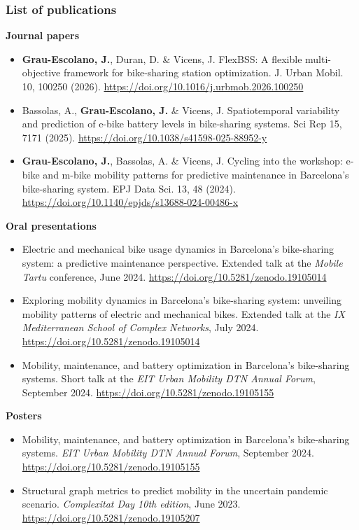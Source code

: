 \subsubsection{List of publications}

\vspace{1em} %
\textbf{Journal papers}
\begin{itemize}
    \item{\textbf{Grau-Escolano, J.}, Duran, D. \& Vicens, J.
    FlexBSS: A flexible multi-objective framework for bike-sharing station optimization. J. Urban Mobil. 10, 100250 (2026). \url{https://doi.org/10.1016/j.urbmob.2026.100250}}
    \item{Bassolas, A., \textbf{Grau-Escolano, J.} \& Vicens, J. Spatiotemporal variability and prediction of e-bike battery levels in bike-sharing systems. Sci Rep 15, 7171 (2025). \url{https://doi.org/10.1038/s41598-025-88952-y}}
    \item{\textbf{Grau-Escolano, J.}, Bassolas, A. \& Vicens, J. Cycling into the workshop: e-bike and m-bike mobility patterns for predictive maintenance in Barcelona's bike-sharing system. EPJ Data Sci. 13, 48 (2024). \url{https://doi.org/10.1140/epjds/s13688-024-00486-x}}
\end{itemize}

\vspace{1em}
\textbf{Oral presentations}
\begin{itemize}
    \item Electric and mechanical bike usage dynamics in Barcelona's bike-sharing system: a predictive maintenance perspective. Extended talk at the \textit{Mobile Tartu} conference, June 2024. \url{https://doi.org/10.5281/zenodo.19105014}
    \item Exploring mobility dynamics in Barcelona's bike-sharing system: unveiling mobility patterns of electric and mechanical bikes. Extended talk at the \textit{IX Mediterranean School of Complex Networks}, July 2024. \url{https://doi.org/10.5281/zenodo.19105014}
    \item Mobility, maintenance, and battery optimization in Barcelona's bike-sharing systems. Short talk at the \textit{EIT Urban Mobility DTN Annual Forum}, September 2024. \url{https://doi.org/10.5281/zenodo.19105155}
\end{itemize}


\vspace{1em}
\textbf{Posters}
\begin{itemize}
    \item Mobility, maintenance, and battery optimization in Barcelona's bike-sharing systems. \textit{EIT Urban Mobility DTN Annual Forum}, September 2024. \url{https://doi.org/10.5281/zenodo.19105155}
    \item Structural graph metrics to predict mobility in the uncertain pandemic scenario. \textit{Complexitat Day 10th edition}, June 2023. \url{https://doi.org/10.5281/zenodo.19105207}
\end{itemize}

